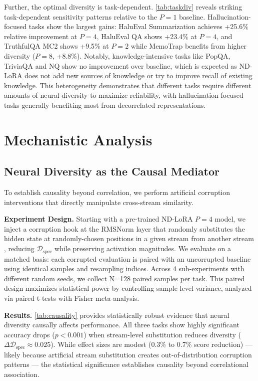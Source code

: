 \documentclass{article} %
\begin{document}
Further, the optimal diversity is task-dependent. \autoref{tab:taskdiv} reveals striking task-dependent
sensitivity patterns relative to the $P=1$ baseline. Hallucination-focused tasks show the largest
gains: HaluEval Summarization achieves +25.6\% relative improvement at $P=4$, HaluEval QA shows +23.4\% at $P=4$,
and TruthfulQA MC2 shows +9.5\% at $P=2$ while MemoTrap benefits from higher diversity ($P=8$, +8.8\%).
Notably, knowledge-intensive tasks like PopQA, TriviaQA and NQ show no improvement over baseline, which is
expected as ND-LoRA does not add new sources of knowledge or try to improve recall of existing knowledge.
This heterogeneity demonstrates that different tasks require different amounts of neural diversity to
maximize reliability, with hallucination-focused tasks generally benefiting most from decorrelated representations.

\section{Mechanistic Analysis}
\subsection{Neural Diversity as the Causal Mediator}
\label{sec:causality}
To establish causality beyond correlation, we perform artificial corruption interventions that directly
manipulate cross-stream similarity.

\textbf{Experiment Design.}
Starting with a pre-trained ND-LoRA $P=4$ model, we inject a corruption hook at the RMSNorm layer that
randomly substitutes the hidden state at randomly-chosen positions in a given stream from another stream , reducing
$\mathcal{D}_{\text{spec}}$ while preserving activation magnitudes. We evaluate on a matched basis: each
corrupted evaluation is paired with an uncorrupted baseline using identical samples and resampling indices.
Across 4 sub-experiments with different random seeds, we collect N=128 paired samples per task. This paired
design maximizes statistical power by controlling sample-level variance, analyzed via paired t-tests with
Fisher meta-analysis.

\textbf{Results.}
\autoref{tab:causality} provides statistically robust evidence that neural diversity causally affects
performance. All three tasks show highly significant accuracy drops ($p < 0.001$) when stream-level
substitution reduces diversity ($\Delta\mathcal{D}_{\text{spec}} \approx 0.025$). While effect sizes are
modest (0.3\% to 0.7\% score reduction) --- likely because artificial stream substitution creates
out-of-distribution corruption patterns --- the statistical significance establishes causality beyond
correlational association.
\end{document}
